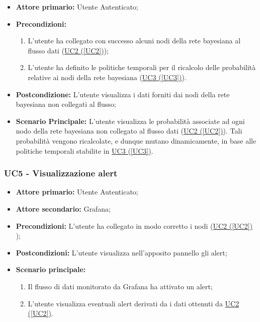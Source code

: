 \begin{itemize}
\item \textbf{Attore primario:} Utente Autenticato;
\item \textbf{Precondizioni:}
	\begin{enumerate}
	\item L'utente ha collegato con successo alcuni nodi della rete bayesiana al flusso dati (\hyperref[UC2]{UC2 (\ref*{UC2})});
	\item L'utente ha definito le politiche temporali per il ricalcolo delle probabilità relative ai nodi della rete bayesiana (\hyperref[UC3]{UC3 (\ref*{UC3})}).
	\end{enumerate}
\item \textbf{Postcondizione:} L'utente visualizza i dati forniti dai nodi della rete bayesiana non collegati al flusso;
\item \textbf{Scenario Principale:} L'utente visualizza le probabilità associate ad ogni nodo della rete bayesiana non collegato al flusso dati (\hyperref[UC2]{UC2 (\ref*{UC2})}). Tali probabilità vengono ricalcolate, e dunque mutano dinamicamente, in base alle politiche temporali stabilite in \hyperref[UC3]{UC3 (\ref*{UC3})}.
\end{itemize}

\pagebreak


\subsubsection{UC5 - Visualizzazione alert}\label{UC5}
\begin{itemize}
	\item \textbf{Attore primario:} Utente Autenticato;
	\item \textbf{Attore secondario:} Grafana;
	\item \textbf{Precondizioni:} L'utente ha collegato in modo corretto i nodi (\hyperref[UC2]{UC2 (\ref*{UC2})} );
	\item \textbf{Postcondizioni:} L'utente visualizza nell'apposito pannello gli alert;
	\item \textbf{Scenario principale:}
	\begin{enumerate}
		\item Il flusso di dati monitorato da Grafana ha attivato un alert;
		\item L'utente visualizza eventuali alert derivati da i dati ottenuti da  \hyperref[UC2]{UC2 (\ref*{UC2})}.
	\end{enumerate}
\end{itemize}

